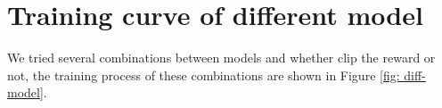 \documentclass[12pt]{article}
\begin{document}
\begin{appendices}
\begin{table}[H]
\begin{tabular}{cc}
    \bottomrule
    \end{tabular}
\end{table}

\newpage
\section{Training curve of different model}\label{Models}
We tried several combinations between models and whether clip the reward or not, the training process of these combinations are shown in Figure \ref{fig: diff-model}.

\begin{figure}[h]
\centering

%
%
\quad
{}%
\end{figure}
\end{appendices}
\end{document}
